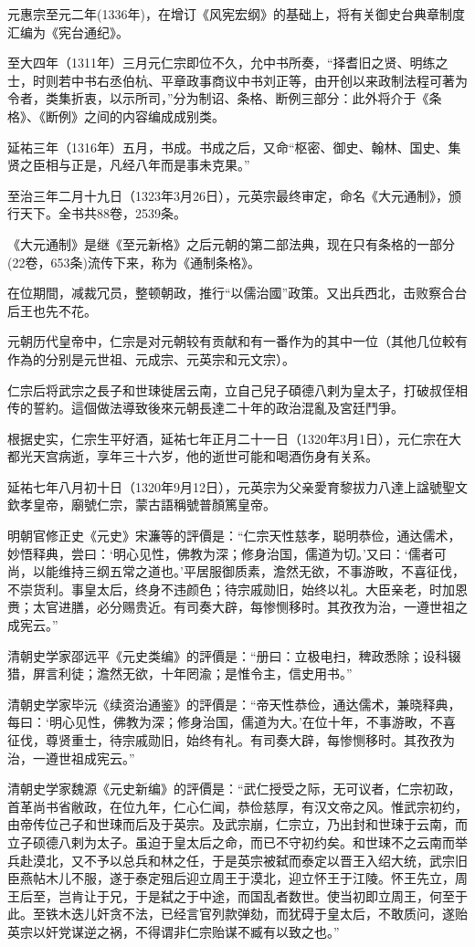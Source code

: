 元惠宗至元二年(1336年)，在增订《风宪宏纲》的基础上，将有关御史台典章制度汇编为《宪台通纪》。

至大四年（1311年）三月元仁宗即位不久，允中书所奏，“择耆旧之贤、明练之士，时则若中书右丞伯杭、平章政事商议中书刘正等，由开创以来政制法程可著为令者，类集折衷，以示所司，”分为制诏、条格、断例三部分：此外将介于《条格》、《断例》之间的内容编成成别类。

延祐三年（1316年）五月，书成。书成之后，又命“枢密、御史、翰林、国史、集贤之臣相与正是，凡经八年而是事未克果。”

至治三年二月十九日（1323年3月26日），元英宗最终审定，命名《大元通制》，颁行天下。全书共88卷，2539条。

《大元通制》是继《至元新格》之后元朝的第二部法典，现在只有条格的一部分(22卷，653条)流传下来，称为《通制条格》。

在位期間，减裁冗员，整顿朝政，推行“以儒治國”政策。又出兵西北，击败察合台后王也先不花。

元朝历代皇帝中，仁宗是对元朝较有贡献和有一番作为的其中一位（其他几位較有作為的分别是元世祖、元成宗、元英宗和元文宗）。

仁宗后将武宗之長子和世㻋徙居云南，立自己兒子碩德八剌为皇太子，打破叔侄相传的誓約。這個做法導致後來元朝長達二十年的政治混亂及宮廷鬥爭。

根据史实，仁宗生平好酒，延祐七年正月二十一日（1320年3月1日），元仁宗在大都光天宫病逝，享年三十六岁，他的逝世可能和喝酒伤身有关系。

延祐七年八月初十日（1320年9月12日），元英宗为父亲愛育黎拔力八達上諡號聖文欽孝皇帝，廟號仁宗，蒙古語稱號普顏篤皇帝。

明朝官修正史《元史》宋濂等的評價是：“仁宗天性慈孝，聪明恭俭，通达儒术，妙悟释典，尝曰：‘明心见性，佛教为深；修身治国，儒道为切。’又曰：‘儒者可尚，以能维持三纲五常之道也。’平居服御质素，澹然无欲，不事游畋，不喜征伐，不崇货利。事皇太后，终身不违颜色；待宗戚勋旧，始终以礼。大臣亲老，时加恩赉；太官进膳，必分赐贵近。有司奏大辟，每惨恻移时。其孜孜为治，一遵世祖之成宪云。”

清朝史学家邵远平《元史类编》的評價是：“册曰：立极电扫，稗政悉除；设科辍猎，屏言利徒；澹然无欲，十年罔渝；是惟令主，信史用书。”

清朝史学家毕沅《续资治通鉴》的評價是：“帝天性恭俭，通达儒术，兼晓释典，每曰：‘明心见性，佛教为深；修身治国，儒道为大。’在位十年，不事游畋，不喜征伐，尊贤重士，待宗戚勋旧，始终有礼。有司奏大辟，每惨恻移时。其孜孜为治，一遵世祖成宪云。”

清朝史学家魏源《元史新编》的評價是：“武仁授受之际，无可议者，仁宗初政，首革尚书省敝政，在位九年，仁心仁闻，恭俭慈厚，有汉文帝之风。惟武宗初约，由帝传位己子和世㻋而后及于英宗。及武宗崩，仁宗立，乃出封和世㻋于云南，而立子硕德八剌为太子。虽迫于皇太后之命，而已不守初约矣。和世㻋不之云南而举兵赴漠北，又不予以总兵和林之任，于是英宗被弑而泰定以晋王入绍大统，武宗旧臣燕帖木儿不服，遂于泰定殂后迎立周王于漠北，迎立怀王于江陵。怀王先立，周王后至，岂肯让于兄，于是弑之于中途，而国乱者数世。使当初即立周王，何至于此。至铁木迭儿奸贪不法，已经言官列款弹劾，而犹碍于皇太后，不敢质问，遂贻英宗以奸党谋逆之祸，不得谓非仁宗贻谋不臧有以致之也。”

